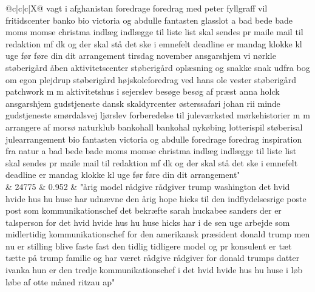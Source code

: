 \begin{xltabular}{\linewidth}{@{}c|c|c|X@{}}
vagt i afghanistan foredrage foredrag med peter fyllgraff vil fritidscenter banko bio victoria og abdulle fantasten glasslot a bad bede bade moms momse christma indlæg indlægge til liste list skal sendes pr maile mail til redaktion mf dk og der skal stå det ske i emnefelt deadline er mandag klokke kl uge før føre din dit arrangement tirsdag november ansgarshjem vi nørkle støberigård åben aktivitetscenter støberigård oplæsning og snakke snak udfra bog om egon plejdrup støberigård højskoleforedrag ved hans ole vester støberigård patchwork m m aktivitetshus i sejerslev besøge besøg af præst anna holck ansgarshjem gudstjeneste dansk skaldyrcenter østerssafari johan rii minde gudstjeneste smørdalsvej ljørslev forberedelse til juleværksted mørkehistorier m m arrangere af morsø naturklub bankohall bankohal nykøbing lotterispil støberisal julearrangement bio fantasten victoria og abdulle foredrage foredrag inspiration fra natur a bad bede bade moms momse christma indlæg indlægge til liste list skal sendes pr maile mail til redaktion mf dk og der skal stå det ske i emnefelt deadline er mandag klokke kl uge før føre din dit arrangement" \\
		 & 24775 & 0.952 & "årig model rådgive rådgiver trump washington det hvid hvide hus hu huse har udnævne den årig hope hicks til den indflydelsesrige poste post som kommunikationschef det bekræfte sarah huckabee sanders der er talsperson for det hvid hvide hus hu huse hicks har i de sen uge arbejde som midlertidig kommunikationschef for den amerikansk præsident donald trump men nu er stilling blive faste fast den tidlig tidligere model og pr konsulent er tæt tætte på trump familie og har været rådgive rådgiver for donald trumps datter ivanka hun er den tredje kommunikationschef i det hvid hvide hus hu huse i løb løbe af otte måned ritzau ap" \\
		\midrule

\end{xltabular}
